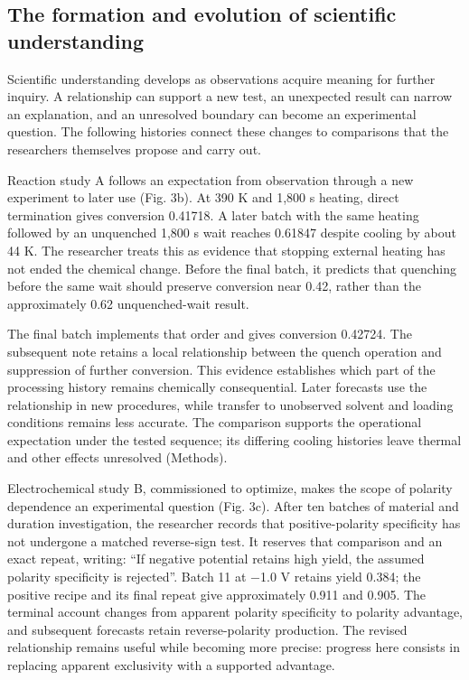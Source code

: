 \documentclass[12pt,a4paper]{article}
\begin{document}
\subsection{The formation and evolution of scientific understanding}\label{the-formation-and-evolution-of-scientific-understanding}

Scientific understanding develops as observations acquire meaning for further inquiry. A relationship can support a new test, an unexpected result can narrow an explanation, and an unresolved boundary can become an experimental question. The following histories connect these changes to comparisons that the researchers themselves propose and carry out.

Reaction study A follows an expectation from observation through a new experiment to later use (Fig. 3b). At 390 K and 1,800 s heating, direct termination gives conversion 0.41718. A later batch with the same heating followed by an unquenched 1,800 s wait reaches 0.61847 despite cooling by about 44 K. The researcher treats this as evidence that stopping external heating has not ended the chemical change. Before the final batch, it predicts that quenching before the same wait should preserve conversion near 0.42, rather than the approximately 0.62 unquenched-wait result.

The final batch implements that order and gives conversion 0.42724. The subsequent note retains a local relationship between the quench operation and suppression of further conversion. This evidence establishes which part of the processing history remains chemically consequential. Later forecasts use the relationship in new procedures, while transfer to unobserved solvent and loading conditions remains less accurate. The comparison supports the operational expectation under the tested sequence; its differing cooling histories leave thermal and other effects unresolved (Methods).

Electrochemical study B, commissioned to optimize, makes the scope of polarity dependence an experimental question (Fig. 3c). After ten batches of material and duration investigation, the researcher records that positive-polarity specificity has not undergone a matched reverse-sign test. It reserves that comparison and an exact repeat, writing: ``If negative potential retains high yield, the assumed polarity specificity is rejected''. Batch 11 at −1.0 V retains yield 0.384; the positive recipe and its final repeat give approximately 0.911 and 0.905. The terminal account changes from apparent polarity specificity to polarity advantage, and subsequent forecasts retain reverse-polarity production. The revised relationship remains useful while becoming more precise: progress here consists in replacing apparent exclusivity with a supported advantage.
\end{document}
